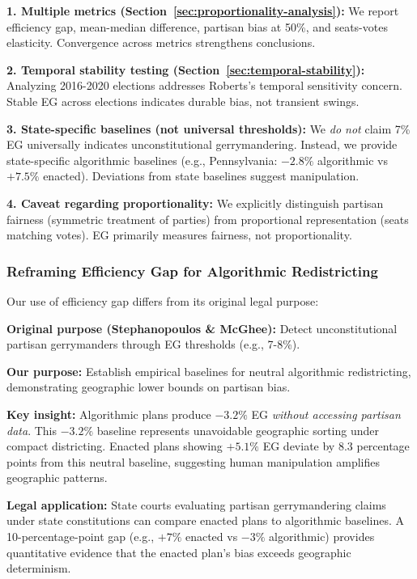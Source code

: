 \textbf{1. Multiple metrics (Section~\ref{sec:proportionality-analysis}):}
We report efficiency gap, mean-median difference, partisan bias at 50\%, and seats-votes elasticity. Convergence across metrics strengthens conclusions.

\textbf{2. Temporal stability testing (Section~\ref{sec:temporal-stability}):}
Analyzing 2016-2020 elections addresses Roberts's temporal sensitivity concern. Stable EG across elections indicates durable bias, not transient swings.

\textbf{3. State-specific baselines (not universal thresholds):}
We \emph{do not} claim 7\% EG universally indicates unconstitutional gerrymandering. Instead, we provide state-specific algorithmic baselines (e.g., Pennsylvania: $-2.8\%$ algorithmic vs $+7.5\%$ enacted). Deviations from state baselines suggest manipulation.

\textbf{4. Caveat regarding proportionality:}
We explicitly distinguish partisan fairness (symmetric treatment of parties) from proportional representation (seats matching votes). EG primarily measures fairness, not proportionality.

\subsubsection{Reframing Efficiency Gap for Algorithmic Redistricting}

Our use of efficiency gap differs from its original legal purpose:

\textbf{Original purpose (Stephanopoulos \& McGhee):} Detect unconstitutional partisan gerrymanders through EG thresholds (e.g., 7-8\%).

\textbf{Our purpose:} Establish empirical baselines for neutral algorithmic redistricting, demonstrating geographic lower bounds on partisan bias.

\textbf{Key insight:} Algorithmic plans produce $-3.2\%$ EG \emph{without accessing partisan data}. This $-3.2\%$ baseline represents unavoidable geographic sorting under compact districting. Enacted plans showing $+5.1\%$ EG deviate by 8.3 percentage points from this neutral baseline, suggesting human manipulation amplifies geographic patterns.

\textbf{Legal application:} State courts evaluating partisan gerrymandering claims under state constitutions can compare enacted plans to algorithmic baselines. A 10-percentage-point gap (e.g., $+7\%$ enacted vs $-3\%$ algorithmic) provides quantitative evidence that the enacted plan's bias exceeds geographic determinism.

